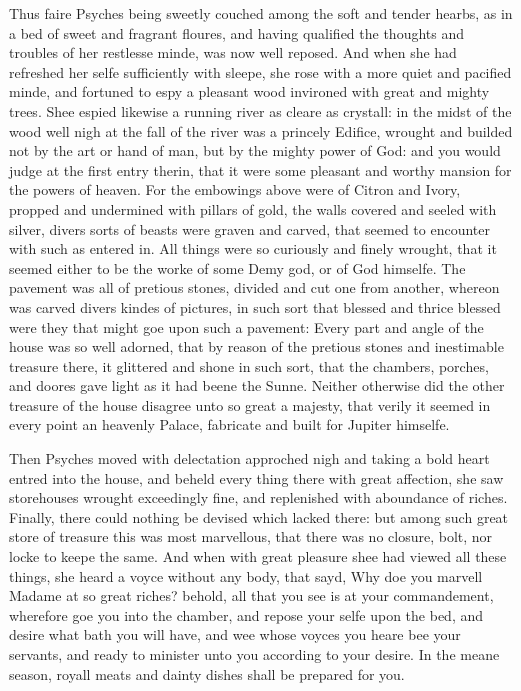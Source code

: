 Thus faire Psyches being sweetly couched among the soft and tender hearbs, as
in a bed of sweet and fragrant floures, and having qualified the thoughts and
troubles of her restlesse minde, was now well reposed. And when she had
refreshed her selfe sufficiently with sleepe, she rose with a more quiet and
pacified minde, and fortuned to espy a pleasant wood invironed with great and
mighty trees. Shee espied likewise a running river as cleare as crystall: in
the midst of the wood well nigh at the fall of the river was a princely
Edifice, wrought and builded not by the art or hand of man, but by the mighty
power of God: and you would judge at the first entry therin, that it were some
pleasant and worthy mansion for the powers of heaven. For the embowings above
were of Citron and Ivory, propped and undermined with pillars of gold, the
walls covered and seeled with silver, divers sorts of beasts were graven and
carved, that seemed to encounter with such as entered in. All things were so
curiously and finely wrought, that it seemed either to be the worke of some
Demy god, or of God himselfe. The pavement was all of pretious stones, divided
and cut one from another, whereon was carved divers kindes of pictures, in such
sort that blessed and thrice blessed were they that might goe upon such a
pavement: Every part and angle of the house was so well adorned, that by reason
of the pretious stones and inestimable treasure there, it glittered and shone
in such sort, that the chambers, porches, and doores gave light as it had beene
the Sunne. Neither otherwise did the other treasure of the house disagree unto
so great a majesty, that verily it seemed in every point an heavenly Palace,
fabricate and built for Jupiter himselfe.

Then Psyches moved with delectation approched nigh and taking a bold heart
entred into the house, and beheld every thing there with great affection, she
saw storehouses wrought exceedingly fine, and replenished with aboundance of
riches. Finally, there could nothing be devised which lacked there: but among
such great store of treasure this was most marvellous, that there was no
closure, bolt, nor locke to keepe the same. And when with great pleasure shee
had viewed all these things, she heard a voyce without any body, that sayd, Why
doe you marvell Madame at so great riches? behold, all that you see is at your
commandement, wherefore goe you into the chamber, and repose your selfe upon
the bed, and desire what bath you will have, and wee whose voyces you heare bee
your servants, and ready to minister unto you according to your desire. In the
meane season, royall meats and dainty dishes shall be prepared for you.

